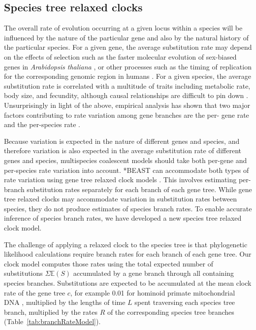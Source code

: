\documentclass[nogrid]{MBE}%
\begin{document}
\subsection{Species tree relaxed clocks}

The overall rate of evolution occurring at a given locus within a species will
be influenced by the nature of the particular gene and also by the natural
history of the particular species. For a given gene, the average substitution
rate may depend on the effects of selection such as the faster molecular
evolution of sex-biased genes in \textit{Arabidopsis thaliana}
\citep{Gossmann01032014}, or other processes such as the timing of replication
for the corresponding genomic region in humans \citep{Stamatoyannopoulos2009}.
For a given species, the average substitution rate is correlated with a
multitude of traits including metabolic rate, body size, and fecundity, although
causal relationships are difficult to pin down \citep{Bromham2503}.
Unsurprisingly in light of the above, empirical analysis has shown that two
major factors contributing to rate variation among gene branches are the per-
gene rate and the per-species rate \citep{Rasmussen01122007}.

Because variation is expected in the nature of different genes and species, and
therefore variation is also expected in the average substitution rate of different
genes and species, multispecies coalescent models should take both per-gene and
per-species rate variation into account. *BEAST can accommodate both types of
rate variation using gene tree relaxed clock models \citep[for examples see][]{Berv2014120, Lambert2015146}.
This involves estimating per-branch substitution rates separately
for each branch of each gene tree. While gene tree relaxed clocks may
accommodate variation in substitution rates between species, they do not produce
estimates of species branch rates. To enable accurate inference of species
branch rates, we have developed a new species tree relaxed clock model.

The challenge of applying a relaxed clock to the species tree is that
phylogenetic likelihood calculations require branch rates for each branch of
each gene tree. Our clock model computes those rates using the total expected number of substitutions
$\Sigma \mathbb{E}(S)$ accumulated by a gene branch through all containing
species branches. Substitutions are expected to be accumulated at the mean
clock rate of the gene tree $c$, for example 0.01 for hominoid primate
mitochondrial DNA \citep{doi:10.1146/annurev.es.18.110187.001413}, multiplied
by the lengths of time $L$ spent traversing each species tree branch, multiplied
by the rates $R$ of the corresponding species tree branches
(Table~\ref{tab:branchRateModel}).
\end{document}
